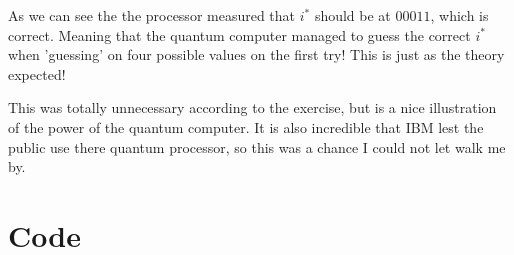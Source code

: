 \documentclass[a4paper,norsk, 10pt]{article}
\begin{document}
As we can see the the processor measured that $i^*$ should be at $00011$, which is correct. Meaning that the quantum computer managed to guess the correct $i^*$ when 'guessing' on four possible values on the first try!  This is just as the theory expected!

This was totally unnecessary according to the exercise, but is a nice illustration of the power of the quantum computer. It is also incredible that IBM lest the public use there quantum processor, so this was a chance I could not let walk me by.
\section{Code}\label{sec:code}

\end{document}
